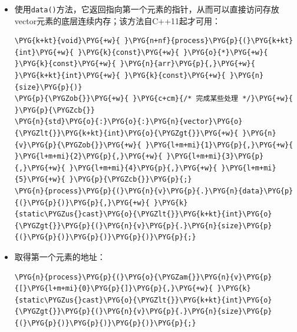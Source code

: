 \begin{itemize}
\item 使用\texttt{data()}方法，它返回指向第一个元素的指针，从而可以直接访问存放vector元素的底层连续内存；该方法自C++11起才可用：



\begin{codeblockbg}
\begin{Verbatim}[commandchars=\\\{\},breaklines=true,breakanywhere=true,fontsize=\codefont,xleftmargin=17bp]
\PYG{k+kt}{void}\PYG{+w}{ }\PYG{n+nf}{process}\PYG{p}{(}\PYG{k+kt}{int}\PYG{+w}{ }\PYG{k}{const}\PYG{+w}{ }\PYG{o}{*}\PYG{+w}{ }\PYG{k}{const}\PYG{+w}{ }\PYG{n}{arr}\PYG{p}{,}\PYG{+w}{ }\PYG{k+kt}{int}\PYG{+w}{ }\PYG{k}{const}\PYG{+w}{ }\PYG{n}{size}\PYG{p}{)}
\PYG{p}{\PYGZob{}}\PYG{+w}{ }\PYG{c+cm}{/* 完成某些处理 */}\PYG{+w}{ }\PYG{p}{\PYGZcb{}}
\PYG{n}{std}\PYG{o}{:}\PYG{o}{:}\PYG{n}{vector}\PYG{o}{\PYGZlt{}}\PYG{k+kt}{int}\PYG{o}{\PYGZgt{}}\PYG{+w}{ }\PYG{n}{v}\PYG{p}{\PYGZob{}}\PYG{+w}{ }\PYG{l+m+mi}{1}\PYG{p}{,}\PYG{+w}{ }\PYG{l+m+mi}{2}\PYG{p}{,}\PYG{+w}{ }\PYG{l+m+mi}{3}\PYG{p}{,}\PYG{+w}{ }\PYG{l+m+mi}{4}\PYG{p}{,}\PYG{+w}{ }\PYG{l+m+mi}{5}\PYG{+w}{ }\PYG{p}{\PYGZcb{}}\PYG{p}{;}
\PYG{n}{process}\PYG{p}{(}\PYG{n}{v}\PYG{p}{.}\PYG{n}{data}\PYG{p}{(}\PYG{p}{)}\PYG{p}{,}\PYG{+w}{ }\PYG{k}{static\PYGZus{}cast}\PYG{o}{\PYGZlt{}}\PYG{k+kt}{int}\PYG{o}{\PYGZgt{}}\PYG{p}{(}\PYG{n}{v}\PYG{p}{.}\PYG{n}{size}\PYG{p}{(}\PYG{p}{)}\PYG{p}{)}\PYG{p}{)}\PYG{p}{;}
\end{Verbatim}
\end{codeblockbg}



\item 取得第一个元素的地址：



\begin{codeblockbg}
\begin{Verbatim}[commandchars=\\\{\},breaklines=true,breakanywhere=true,fontsize=\codefont,xleftmargin=17bp]
\PYG{n}{process}\PYG{p}{(}\PYG{o}{\PYGZam{}}\PYG{n}{v}\PYG{p}{[}\PYG{l+m+mi}{0}\PYG{p}{]}\PYG{p}{,}\PYG{+w}{ }\PYG{k}{static\PYGZus{}cast}\PYG{o}{\PYGZlt{}}\PYG{k+kt}{int}\PYG{o}{\PYGZgt{}}\PYG{p}{(}\PYG{n}{v}\PYG{p}{.}\PYG{n}{size}\PYG{p}{(}\PYG{p}{)}\PYG{p}{)}\PYG{p}{)}\PYG{p}{;}
\end{Verbatim}
\end{codeblockbg}



\end{itemize}
